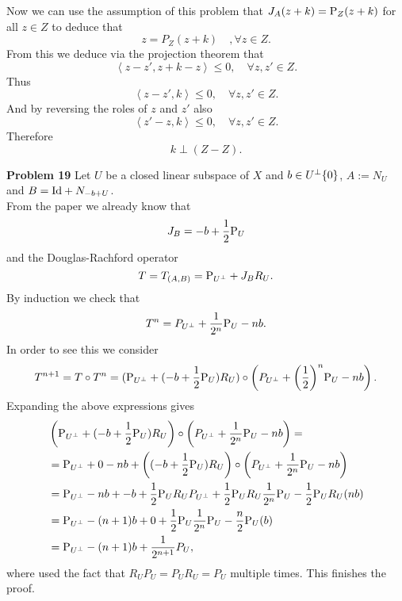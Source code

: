 \documentclass{scrartcl}
\theoremstyle{plain}
\theoremstyle{remark}
\newcommand{\Id}{\textup{Id}}
\renewcommand{\P}{\textup{P}}
\begin{document}
Now we can use the assumption of this problem that $J_A(z+k) = \P_Z(z+k)$ for all $z \in Z$ to deduce that
\begin{equation}
  z = P_Z(z+k) \quad, \forall z \in Z.
\end{equation}
From this we deduce via the projection theorem that
\begin{equation}
  \left\langle z-z', z+k - z \right\rangle\le 0, \quad \forall z,z' \in Z.
\end{equation}
Thus
\begin{equation}
  \left\langle z-z', k \right\rangle\le 0, \quad \forall z,z' \in Z.
\end{equation}
And by reversing the roles of $z$ and $z'$ also
\begin{equation}
  \left\langle z'-z, k \right\rangle\le 0, \quad \forall z,z' \in Z.
\end{equation}
Therefore
\begin{equation}
  k \perp (Z-Z).
\end{equation}

\textbf{Problem 19} Let $U$ be a closed linear subspace of $X$ and $b \in U^{\perp}\\ \{0\}$, $A:= N_U$ and $B=\Id + N_{-b+U}$. \\
From the paper we already know that
\begin{equation}
  J_B = -b +\frac{1}{2}\P_U
\end{equation}
and the Douglas-Rachford operator
\begin{equation}
  T = T_{(A,B)} = \P_{U^{\perp}} + J_B R_U.
\end{equation}
By induction we check that
\begin{equation}
  T^n = P_{U^{\perp}} + \frac{1}{2^n} \P_U - n b.
\end{equation}
In order to see this we consider
\begin{equation}
  T^{n+1} = T \circ T^{n} = (\P_{U^{\perp}} + (-b +\frac{1}{2}\P_U) R_U)\circ\left(P_{U^{\perp}} + {\left(\frac{1}{2}\right)}^{n} \P_U - n b\right).
\end{equation}
Expanding the above expressions gives
\begin{equation}
  \begin{aligned}
    &\left(\P_{U^{\perp}} + (-b +\frac{1}{2}\P_U) R_U\right)\circ\left(P_{U^{\perp}} + \frac{1}{2^n} \P_U - n b\right) = \\
    &= \P_{U^{\perp}} + 0 - nb + \left((-b +\frac{1}{2}\P_U) R_U\right) \circ \left(P_{U^{\perp}} + \frac{1}{2^n} \P_U - n b\right)\\
    &= \P_{U^{\perp}} - nb + - b + \frac{1}{2}\P_U R_U P_{U^{\perp}} + \frac{1}{2}\P_U R_U \frac{1}{2^n} \P_U  - \frac{1}{2}\P_U R_U(n b) \\
    &= \P_{U^{\perp}} - (n+1)b + 0 + \frac{1}{2}\P_U \frac{1}{2^n} \P_U - \frac{n}{2}\P_U ( b) \\
    &= \P_{U^{\perp}} - (n+1)b  + \frac{1}{2^{n+1}} P_U,
  \end{aligned}
\end{equation}
where used the fact that $R_U P_U = P_U R_U = P_U$ multiple times.
This finishes the proof.\\
\end{document}
